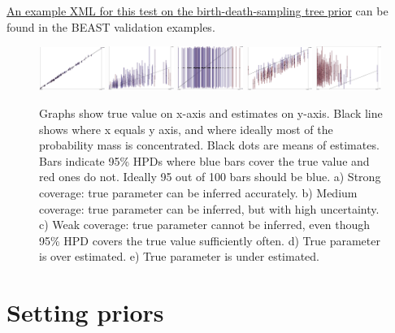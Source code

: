 \documentclass[oneside]{article}
\begin{document}
\href{https://github.com/christiaanjs/beast-validation/blob/master/examples/birth-death-sampling-prior-sampling-test.xml}{An
example XML for this test on the birth-death-sampling tree prior} can be
found in the BEAST validation examples.

\begin{figure}
\includegraphics[width=0.19\textwidth]{../figures/bargraph-ok-strong}
\includegraphics[width=0.19\textwidth]{../figures/bargraph-ok-medium}
\includegraphics[width=0.19\textwidth]{../figures/bargraph-ok-weak}
\includegraphics[width=0.19\textwidth]{../figures/bargraph-under}
\includegraphics[width=0.19\textwidth]{../figures/bargraph-over}
\caption{\label{fig:coverage}
Graphs show true value on x-axis and estimates on y-axis. Black line shows where x equals y axis, and where ideally most of the probability mass is concentrated. Black dots are means of estimates. Bars indicate 95\% HPDs where blue bars cover the true value and red ones do not. Ideally 95 out of 100 bars should be blue.
a) Strong coverage: true parameter can be inferred accurately.
b) Medium coverage: true parameter can be inferred, but with high uncertainty.
c) Weak coverage: true parameter cannot be inferred, even though 95\% HPD covers the true value sufficiently often.
d) True parameter is over estimated.
e) True parameter is under estimated.
}
\end{figure}


\section{Setting priors}\label{setting-priors}
\end{document}
